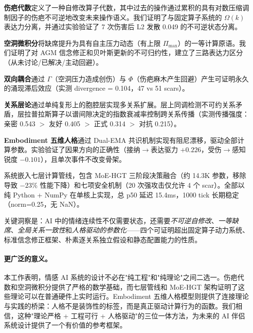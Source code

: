 \documentclass[11pt]{article}
\begin{document}
\textbf{伤疤代数}定义了一种自修改算子代数，其中过去的操作通过累积的具有对数压缩调制因子的伤疤不可逆地改变未来操作语义。我们证明了与固定算子系统的 $\Omega(k)$ 表达力分离，并通过实验验证了 7 次伤害后 L2 发散 0.049 的不可逆状态分离。

\textbf{空洞微积分}将缺席提升为具有自主压力动态（有上限 $\Pi_{\max}$）的一等计算原语。我们证明了对 AGM 信念修正和贝叶斯更新的不可归约性，建立了三路表达力区分（从未讨论/已解决/主动回避）。

\textbf{双向耦合}通过 $\Gamma$（空洞压力造成创伤）与 $\Phi$（伤疤麻木产生回避）产生可证明永久的涌现滞后效应（实测 divergence = 0.104，47 vs 51 scars）。

\textbf{关系层论}通过单纯复形上的胞腔层实现多关系扩展。层上同调检测不可约关系矛盾，层拉普拉斯算子以谱间隙决定的指数衰减率控制跨关系传播（实测传播强度：亲密 0.543 $>$ 友好 0.405 $>$ 正式 0.314 $>$ 对抗 0.215）。

\textbf{Embodiment 五维人格}通过 Dual-EMA 共识机制实现有阻尼漂移，驱动全部计算参数。实验验证了因果方向的正确性（接纳$\to$表达驱力 $+0.226$，受伤$\to$感知锐度 $-0.101$），且单次事件不改变骨架。

系统嵌入七层计算管线，包含 MoE-HGT 三阶段决策融合（约 14.3K 参数，移除导致 $-23\%$ 性能下降）和七项安全机制（20 次强攻击仅允许 4 个 scar）。全部以纯 Python + NumPy 在单核上实现，总 p50 延迟 15.4ms，1000 tick 长期稳定（norm=0.25，无 NaN）。

关键洞察是：AI 中的情绪连续性不仅需要状态，还需要\emph{不可逆自修改}、\emph{一等缺席}、\emph{全局关系一致性}和\emph{人格驱动的参数化}——四个可证明超出固定算子动力系统、标准信念修正框架、朴素逐关系独立假设和静态配置能力的性质。

\paragraph{更广泛的意义。}本工作表明，情感 AI 系统的设计不必在"纯工程"和"纯理论"之间二选一。伤疤代数和空洞微积分提供了严格的数学基础，而七层管线和 MoE-HGT 架构证明了这些理论可以在普通硬件上实时运行。Embodiment 五维人格模型则提供了连接理论与实践的桥梁：人格不是装饰性的标签，而是真正驱动计算行为的函数。我们相信，这种"理论严格 + 工程可行 + 人格驱动"的三位一体方法，为未来的 AI 伴侣系统设计提供了一个有价值的参考框架。


\end{document}
